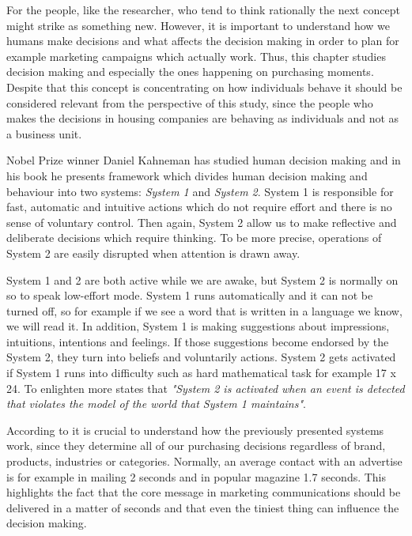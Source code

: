 For the people, like the researcher, who tend to think rationally the next concept might strike as something new.  However, it is important to understand how we humans make decisions and what affects the decision making in order to plan for example marketing campaigns which actually work. Thus, this chapter studies decision making and especially the ones happening on purchasing moments. Despite that this concept is concentrating on how individuals behave it should be considered relevant from the perspective of this study, since the people who makes the decisions in housing companies are behaving as individuals and not as a business unit.

Nobel Prize winner Daniel Kahneman has studied human decision making and in his book  he presents framework which divides human decision making and behaviour into two systems: \emph{System 1} and \emph{System 2}. System 1 is responsible for fast, automatic and intuitive actions which do not require effort and  there is no sense of voluntary control. Then again, System 2 allow us to make reflective and deliberate decisions which require thinking. To be more precise, operations of System 2 are easily disrupted when attention is drawn away.

System 1 and 2 are both active while we are awake, but System 2 is normally on so to speak low-effort mode. System 1 runs automatically and it can not be turned off, so for example if we see a word that is written in a language we know, we will read it. In addition, System 1 is making suggestions about impressions, intuitions, intentions and feelings. If those suggestions become endorsed by the System 2, they turn into beliefs and voluntarily actions. System 2 gets activated if System 1 runs into difficulty such as hard mathematical task for example 17 x 24. To enlighten more \textcite{Kahneman:2011} states that \emph{"System 2 is activated when an event is detected that violates the model of the world that System 1 maintains"}.

According to \textcite{Decoded:2013} it is crucial to understand how the previously presented systems work, since they determine all of our purchasing decisions regardless of brand, products, industries or categories. Normally, an average contact with an advertise is for example in mailing 2 seconds and in popular magazine 1.7 seconds. This highlights the fact that the core message in marketing communications should be delivered in a matter of seconds and that even the tiniest thing can influence the decision making.


